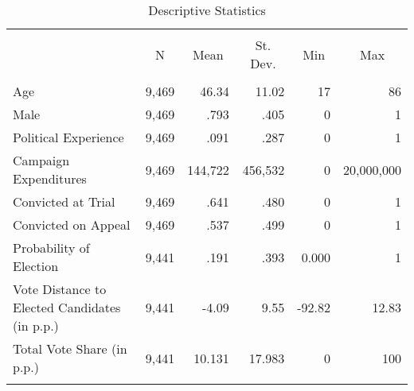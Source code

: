 
\begin{table}[!htbp] \centering
  \caption{Descriptive Statistics}
  \label{tab:sumstats}
\scriptsize
\begin{tabular}{@{\extracolsep{2pt}}lrrrrr}
\\[-1.8ex]\hline
\hline \\[-1.8ex]
& \multicolumn{1}{c}{N} & \multicolumn{1}{c}{Mean} & \multicolumn{1}{c}{St. Dev.} & \multicolumn{1}{c}{Min} & \multicolumn{1}{c}{Max} \\
\hline \\[-1.8ex]
Age                                           & 9,469 & 46.34 & 11.02 & 17 & 86 \\
Male                                          & 9,469 & .793 & .405 & 0 & 1 \\
Political Experience                          & 9,469 & .091 & .287 & 0 & 1 \\
Campaign Expenditures                         & 9,469 & 144,722 & 456,532 & 0 & 20,000,000 \\
Convicted at Trial                            & 9,469 & .641 & .480 & 0 & 1 \\
Convicted on Appeal                           & 9,469 & .537 & .499 & 0 & 1 \\
Probability of Election                       & 9,441 & .191 & .393 & 0.000 & 1 \\
Vote Distance to Elected Candidates (in p.p.) & 9,441 & -4.09 & 9.55 & -92.82 & 12.83 \\
Total Vote Share (in p.p.)                    & 9,441 & 10.131 & 17.983 & 0 & 100 \\
\hline
\hline \\[-1.8ex]
\end{tabular}
\end{table}
